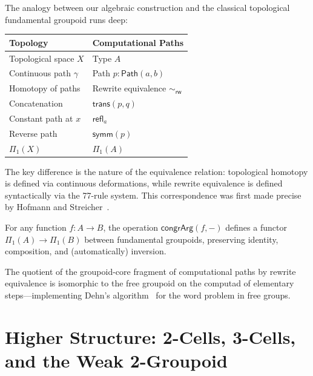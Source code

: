 \documentclass[manuscript]{BSLstyle}
\newcommand{\Path}{\mathsf{Path}}
\newcommand{\refl}{\mathsf{refl}}
\newcommand{\symm}{\mathsf{symm}}
\newcommand{\trans}{\mathsf{trans}}
\newcommand{\congrArg}{\mathsf{congrArg}}
\newcommand{\rweq}{\sim_{\mathsf{rw}}}
\begin{document}
\begin{example}\label{ex:comparison-top}
The analogy between our algebraic construction and the classical
topological fundamental groupoid runs deep:
\begin{center}
\small
\begin{tabular}{ll}
\toprule
\textbf{Topology} & \textbf{Computational Paths} \\
\midrule
Topological space $X$ & Type $A$ \\
Continuous path $\gamma$ & Path $p : \Path(a, b)$ \\
Homotopy of paths & Rewrite equivalence $\rweq$ \\
Concatenation & $\trans(p, q)$ \\
Constant path at $x$ & $\refl_a$ \\
Reverse path & $\symm(p)$ \\
$\Pi_1(X)$ & $\Pi_1(A)$ \\
\bottomrule
\end{tabular}
\end{center}
The key difference is the nature of the equivalence relation: topological
homotopy is defined via continuous deformations, while rewrite equivalence
is defined syntactically via the 77-rule system.
This correspondence was first made precise by Hofmann and
Streicher~\cite{HofmannStreicher98}.
\end{example}

\begin{theorem}[$\congrArg$ as a functor]\label{thm:congrArg-functor}
For any function $f : A \to B$, the operation $\congrArg(f, -)$ defines
a functor $\Pi_1(A) \to \Pi_1(B)$ between fundamental groupoids,
preserving identity, composition, and (automatically) inversion.
\end{theorem}

\begin{theorem}\label{thm:free-groupoid}
The quotient of the groupoid-core fragment of computational paths
by rewrite equivalence is isomorphic to the free groupoid on the
computad of elementary steps---implementing Dehn's algorithm~\cite{Dehn11}
for the word problem in free groups.
\end{theorem}

\section{Higher Structure: 2-Cells, 3-Cells, and the Weak 2-Groupoid}\label{sec:higher}
\end{document}
